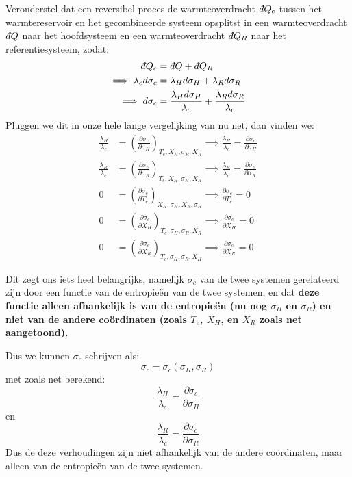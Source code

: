 \begin{derivation}
Veronderstel dat een reversibel proces de warmteoverdracht \(\dbar Q_c\) tussen het warmtereservoir en het gecombineerde systeem opsplitst in een warmteoverdracht \(\dbar Q\)
naar het hoofdsysteem en een warmteoverdracht \(\dbar Q_R\) naar het referentiesysteem, zodat:
\begin{align*}
    \dbar Q_c &= \dbar Q + \dbar Q_R\\
    \implies \lambda_c d\sigma_c &= \lambda_H d\sigma_H + \lambda_R d\sigma_R\\
    \implies d\sigma_c &= \frac{\lambda_H d\sigma_H}{\lambda_c} + \frac{\lambda_R d\sigma_R}{\lambda_c}
\end{align*}
Pluggen we dit in onze hele lange vergelijking van nu net, dan vinden we:
\begin{align*}
    \frac{\lambda_H}{\lambda_c} &= \left(\frac{\partial \sigma_c}{\partial \sigma_H}\right)_{T_e, X_H, \sigma_R , X_R}
    \implies \frac{\lambda_H}{\lambda_c} = \frac{\partial \sigma_c}{\partial \sigma_H} \\
    \frac{\lambda_R}{\lambda_c} &= \left(\frac{\partial \sigma_c}{\partial \sigma_R}\right)_{ T_e, X_H, \sigma_H, X_R}
    \implies \frac{\lambda_R}{\lambda_c} = \frac{\partial \sigma_c}{\partial \sigma_R} \\
    0 &= \left(\frac{\partial \sigma_c}{\partial T_e}\right)_{X_H, \sigma_H, X_R, \sigma_R} 
    \implies \frac{\partial \sigma_c}{\partial T_e} = 0 \\
    0 &= \left( \frac{\partial \sigma_c}{\partial X_H} \right)_{T_e, \sigma_H, \sigma_R, X_R} 
    \implies \frac{\partial \sigma_c}{\partial X_H} = 0 \\
    0 &= \left(\frac{\partial \sigma_c}{\partial X_R} \right)_{T_e, \sigma_H, \sigma_R, X_H}
    \implies \frac{\partial \sigma_c}{\partial X_R} = 0
\end{align*}

Dit zegt ons iets heel belangrijks, namelijk \(\sigma_c\) van de twee systemen gerelateerd zijn door een functie van de entropieën van de twee systemen, en dat \textbf{deze functie alleen afhankelijk is van de entropieën (nu nog \(\sigma_H\) en \(\sigma_R\)) en niet van de andere coördinaten (zoals \(T_e\), \(X_H\), en \(X_R\) zoals net aangetoond).}

Dus we kunnen \(\sigma_c\) schrijven als:
\[\sigma_c = \sigma_c(\sigma_H, \sigma_R)\]
met zoals net berekend:
\[\frac{\lambda_H}{\lambda_c} = \frac{\partial \sigma_c}{\partial \sigma_H}\] en \[\frac{\lambda_R}{\lambda_c} = \frac{\partial \sigma_c}{\partial \sigma_R}\]
Dus de deze verhoudingen zijn niet afhankelijk van de andere coördinaten, maar alleen van de entropieën van de twee systemen.


\end{derivation}
